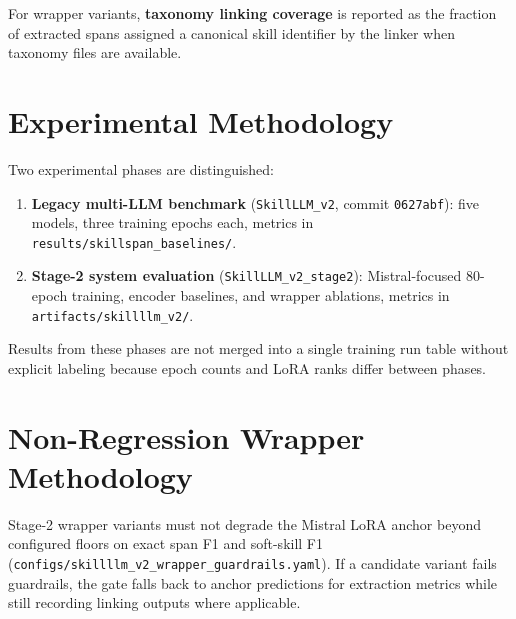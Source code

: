 For wrapper variants, \textbf{taxonomy linking coverage} is reported as the fraction of extracted spans assigned a canonical skill identifier by the linker when taxonomy files are available.

\section{Experimental Methodology}

Two experimental phases are distinguished:

\begin{enumerate}
  \item \textbf{Legacy multi-LLM benchmark} (\texttt{SkillLLM\_v2}, commit \texttt{0627abf}): five models, three training epochs each, metrics in \texttt{results/skillspan\_baselines/}.
  \item \textbf{Stage-2 system evaluation} (\texttt{SkillLLM\_v2\_stage2}): Mistral-focused 80-epoch training, encoder baselines, and wrapper ablations, metrics in \texttt{artifacts/skillllm\_v2/}.
\end{enumerate}

Results from these phases are not merged into a single training run table without explicit labeling because epoch counts and LoRA ranks differ between phases.

\section{Non-Regression Wrapper Methodology}

Stage-2 wrapper variants must not degrade the Mistral LoRA anchor beyond configured floors on exact span F1 and soft-skill F1 (\texttt{configs/skillllm\_v2\_wrapper\_guardrails.yaml}).
If a candidate variant fails guardrails, the gate falls back to anchor predictions for extraction metrics while still recording linking outputs where applicable.
